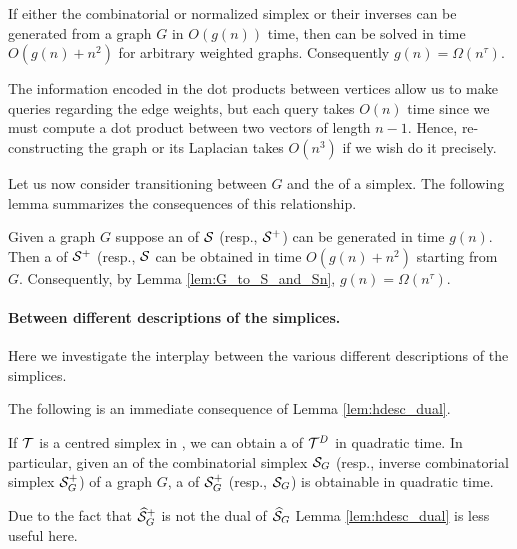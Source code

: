 \begin{lemma}
	\label{lem:G_to_S_and_Sn}
	If either the combinatorial or normalized simplex or their  inverses can be generated from a graph $G$ in $O(g(n))$ time, then \lapdecomp can be solved in time $O(g(n) + n^2)$ for arbitrary weighted graphs. Consequently $g(n) = \Omega(n^\tau)$. 
\end{lemma}

The information encoded in the dot products between vertices allow us to make queries regarding the edge weights, but  each query takes $O(n)$ time since we must compute a dot product between two vectors of length $n-1$. Hence, re-constructing the graph or its Laplacian takes $O(n^3)$ if we wish do it precisely. 

Let us now consider transitioning between $G$ and the \hdesc of a simplex.  The following lemma summarizes the consequences of this relationship. 

\begin{lemma}
	Given a graph $G$ suppose an \hdesc of $\mathcal{S}$ (resp., $\mathcal{S}^+$) can be generated in time $g(n)$. Then a \vdesc of $\mathcal{S}^+$ (resp., $\mathcal{S}$ can be obtained in time $O(g(n) + n^2)$ starting from $G$. Consequently, by Lemma \ref{lem:G_to_S_and_Sn}, $g(n)=\Omega(n^\tau)$. 
\end{lemma}


\paragraph{Between different descriptions of the simplices.}

Here we investigate  the interplay between the various different descriptions of the simplices. 


The following is an immediate consequence of Lemma \ref{lem:hdesc_dual}.  

\begin{corollary}
	\label{cor:hdesc_S_to_S+}
	If $\mathcal{T}$ is a centred simplex in \hdesc, we can obtain a \vdesc of $\mathcal{T}^D$ in quadratic time. In particular, given  an \hdesc of the combinatorial simplex $\mathcal{S}_G$ (resp., inverse combinatorial  simplex $\mathcal{S}_G^+$)  of a graph $G$, a \vdesc of $\mathcal{S}_G^+$ (resp., $\mathcal{S}_G$)  is obtainable in quadratic time. 
\end{corollary}

Due to the fact that $\widehat{\mathcal{S}}_G^+$ is not the dual of $\widehat{\mathcal{S}}_G$ Lemma \ref{lem:hdesc_dual} is less useful here.  

